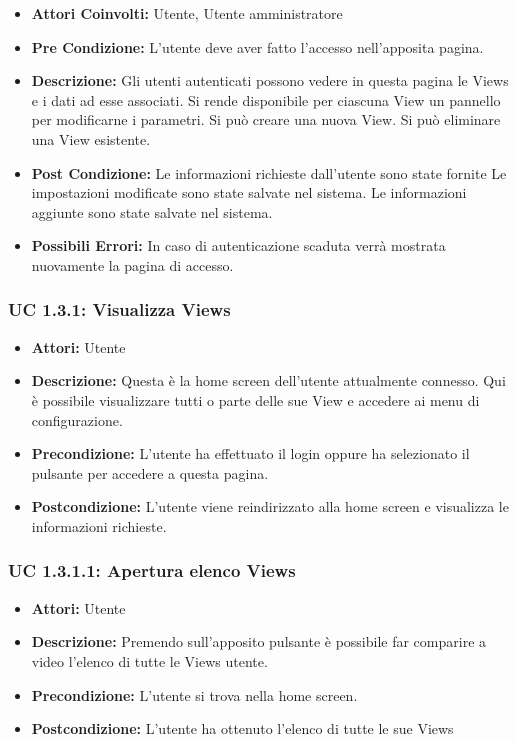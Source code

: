 \begin{itemize}
    \item \textbf{Attori Coinvolti:} Utente, Utente amministratore
    \item \textbf{Pre Condizione:} L’utente deve aver fatto l’accesso nell’apposita pagina.

    \item \textbf{Descrizione:} Gli utenti autenticati possono vedere in questa pagina le Views e i dati ad esse associati.
    Si rende disponibile per ciascuna View un pannello per modificarne i parametri.
    Si può creare una nuova View.
    Si può eliminare una View esistente.

    \item \textbf{Post Condizione:}
    Le informazioni richieste dall'utente sono state fornite
    Le impostazioni modificate sono state salvate nel sistema.
    Le informazioni aggiunte sono state salvate nel sistema.

    \item \textbf{Possibili Errori:}
    In caso di autenticazione scaduta verrà mostrata nuovamente la pagina di accesso.
\end{itemize}

\subsubsection{UC 1.3.1: Visualizza Views}

\begin{itemize}
    \item \textbf{Attori:} Utente
    \item \textbf{Descrizione:} Questa è la home screen dell'utente attualmente connesso. Qui è possibile visualizzare tutti o parte delle sue View e accedere ai menu di configurazione.
    \item \textbf{Precondizione:} L'utente ha effettuato il login oppure ha selezionato il pulsante per accedere a questa pagina.
    \item \textbf{Postcondizione:} L'utente viene reindirizzato alla home screen e visualizza le informazioni richieste.
\end{itemize}

\subsubsection{UC 1.3.1.1: Apertura elenco Views}

\begin{itemize}
    \item \textbf{Attori:} Utente
    \item \textbf{Descrizione:} Premendo sull'apposito pulsante è possibile far comparire a video l'elenco di tutte le Views utente.
    \item \textbf{Precondizione:} L'utente si trova nella home screen.
    \item \textbf{Postcondizione:} L'utente ha ottenuto l'elenco di tutte le sue Views
\end{itemize}


